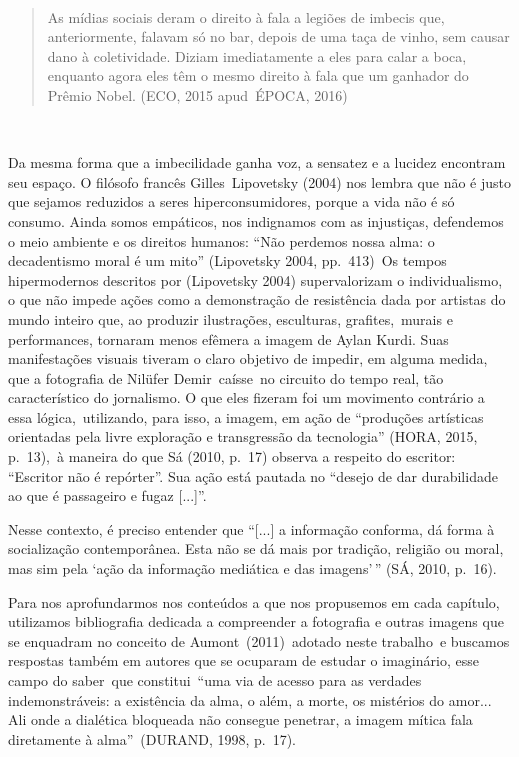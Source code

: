 \documentclass[
  letterpaper,
]{scrbook}
\begin{document}
~

\begin{quote}
As mídias sociais deram o direito à fala a legiões de imbecis que,
anteriormente, falavam só no bar, depois de uma taça de vinho, sem
causar dano à coletividade. Diziam imediatamente a eles para calar a
boca, enquanto agora eles têm o mesmo direito à fala que um ganhador do
Prêmio Nobel. (ECO, 2015 apud~ÉPOCA, 2016)~
\end{quote}

~

Da mesma forma que a imbecilidade ganha voz, a sensatez e a lucidez
encontram seu espaço. O filósofo francês Gilles~Lipovetsky (2004) nos
lembra que não é justo que sejamos reduzidos a seres hiperconsumidores,
porque a vida não é só consumo. Ainda somos empáticos, nos indignamos
com as injustiças, defendemos o meio ambiente e os direitos humanos:
``Não perdemos nossa alma: o decadentismo moral é um mito'' (Lipovetsky
2004, pp.~413)~Os tempos hipermodernos descritos por (Lipovetsky 2004)
supervalorizam o individualismo, o que não impede ações como a
demonstração de resistência dada por artistas do mundo inteiro que, ao
produzir ilustrações, esculturas, grafites,~murais e performances,
tornaram menos efêmera a imagem de Aylan Kurdi. Suas manifestações
visuais tiveram o claro objetivo de impedir, em alguma medida, que a
fotografia de Nilüfer Demir~caísse~no circuito do tempo real, tão
característico do jornalismo. O que eles fizeram foi um movimento
contrário a essa lógica,~utilizando, para isso, a imagem, em ação de
``produções artísticas orientadas pela livre exploração e transgressão
da tecnologia'' (HORA, 2015, p.~13),~à maneira do que Sá (2010, p.~17)
observa a respeito do escritor: ``Escritor não é repórter''. Sua ação
está pautada no ``desejo de dar durabilidade ao que é passageiro e fugaz
{[}...{]}''.

Nesse contexto, é preciso entender que ``{[}...{]} a informação
conforma, dá forma à socialização contemporânea. Esta não se dá mais por
tradição, religião ou moral, mas sim pela `ação da informação mediática
e das imagens'\,'' (SÁ, 2010, p.~16).

Para nos aprofundarmos nos conteúdos a que nos propusemos em cada
capítulo, utilizamos bibliografia dedicada a compreender a fotografia e
outras imagens que se enquadram no conceito de Aumont~(2011)~adotado
neste trabalho~e buscamos respostas também em autores que se ocuparam de
estudar o imaginário, esse campo do saber~que constitui~``uma via de
acesso para as verdades indemonstráveis: a existência da alma, o além, a
morte, os mistérios do amor... Ali onde a dialética bloqueada não
consegue penetrar, a imagem mítica fala diretamente à alma''~(DURAND,
1998, p.~17).
\end{document}
